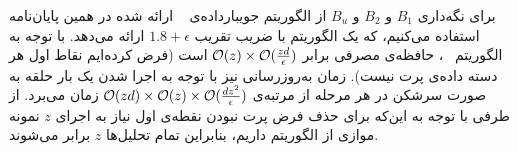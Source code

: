 برای نگه‌داری $B_1$ و $B_2$ و $B_u$ از الگوریتم جویبارداده‌ی ~ ارائه شده در همین پایان‌نامه استفاده می‌کنیم، که یک الگوریتم با ضریب تقریب $1.8 + \epsilon$ ارائه می‌دهد.
با توجه به الگوریتم ~، حافظه‌ی مصرفی برابر $\mathcal{O}(z) \times \mathcal{O}(\frac{zd}{\epsilon})$ است (فرض کرده‌ایم نقاط‌ اول هر دسته داده‌ی پرت نیست).
زمان به‌روزرسانی نیز با توجه به اجرا شدن یک بار حلقه‌ به صورت سرشکن در هر مرحله از مرتبه‌ی 
$\mathcal{O}(zd) \times \mathcal{O}(z) \times \mathcal{O}(\frac{dz^2}{\epsilon})$
 زمان می‌برد.
از طرفی با توجه به این‌که برای حذف فرض پرت نبودن نقطه‌ی اول نیاز به اجرای $z$ نمونه‌ موازی از الگوریتم داریم، بنابراین تمام تحلیل‌ها $z$ برابر می‌شوند.



